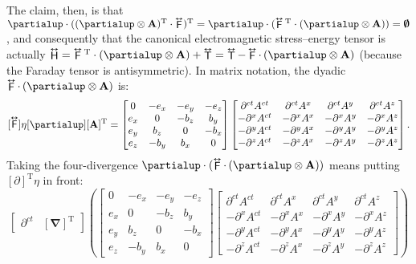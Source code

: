 \documentclass[12pt]{article}
\renewcommand{\vv}[1]{\mathbf{#1}}
\newcommand{\del}{\boldsymbol{\nabla}}
\newcommand{\tightoverset}[2]{%
  \mathop{#2}\limits^{\vbox to -.5ex{\kern-0.75ex\hbox{$#1$}\vss}}}
\newcommand{\inlinedy}[1]{\tightoverset{\text{\tiny$\bm\leftrightarrow$}}{#1}}
\newcommand{\capdy}[1]{ \overset{ \text{\tiny$\bm\leftrightarrow$} }{\vphantom{\text{\small{A}}}\smash{#1}} }
\begin{document}
The claim, then, is that $\partialup \cdot ( ( \partialup \otimes \vv A )^\mathrm{T} \cdot \inlinedy{\mathsf{F}} )^{\mathrm{T}} = \partialup \cdot ( \inlinedy{\mathsf{F}} {}^{\mathrm{T}} \cdot ( \partialup \otimes \vv A ) )  = \textrm{\mbox{\boldmath $\emptyset$}}$, and consequently that the canonical electromagnetic stress--energy tensor is actually $\inlinedy{\mathsf{H}} = \inlinedy{\mathsf{F}} {}^{\mathrm{T}} \cdot ( \partialup \otimes \vv A ) + \inlinedy{\mathsf{T}} = \inlinedy{\mathsf{T}} - \inlinedy{\mathsf{F}} \cdot \, ( \partialup \otimes \vv A ) $ (because the Faraday tensor is antisymmetric). In matrix notation, the dyadic $ \inlinedy{\mathsf{F}} \cdot \, ( \partialup \otimes \vv A )$ is:
\begin{equation*}
\mkern0mu [\capdy{\mathsf{F}}] \eta [\partialup] [\vv A]^{\mathrm{T}} =
\begin{bmatrix}
0 & -e_x & -e_y & -e_z \\
e_x & 0 & -b_z & b_y \\
e_y & b_z & 0 & -b_x \\
e_z & -b_y & b_x & 0
\end{bmatrix}
\begin{bmatrix}
\partial^{ct} A^{ct} & \partial^{ct} A^x & \partial^{ct} A^y & \partial^{ct} A^z \\
- \partial^x A^{ct} & - \partial^x A^x & - \partial^x A^y & - \partial^x A^z  \\
- \partial^y A^{ct} & - \partial^y A^x & - \partial^y A^y & - \partial^y A^z \\
- \partial^z A^{ct} & - \partial^z A^x & - \partial^z A^y & - \partial^z A^z
\end{bmatrix} .
\end{equation*}
Taking the four-divergence $\partialup \cdot (\inlinedy{\mathsf{F}} \cdot \, ( \partialup \otimes \vv A ))$ means putting $[\partialup]^\mathrm{T}\eta$ in front:
\begin{equation*}
\begin{bmatrix}
\partial^{ct} & [ \del ]^\mathrm{T}
\end{bmatrix}
\left(
\begin{bmatrix}
0 & -e_x & -e_y & -e_z \\
e_x & 0 & -b_z & b_y \\
e_y & b_z & 0 & -b_x \\
e_z & -b_y & b_x & 0
\end{bmatrix}
\begin{bmatrix}
\partial^{ct} A^{ct} & \partial^{ct} A^x & \partial^{ct} A^y & \partial^{ct} A^z \\
- \partial^x A^{ct} & - \partial^x A^x & - \partial^x A^y & - \partial^x A^z  \\
- \partial^y A^{ct} & - \partial^y A^x & - \partial^y A^y & - \partial^y A^z \\
- \partial^z A^{ct} & - \partial^z A^x & - \partial^z A^y & - \partial^z A^z
\end{bmatrix}
\right)
\end{equation*}
\end{document}

